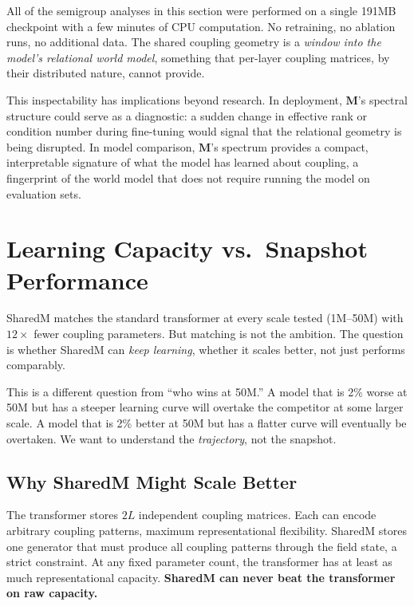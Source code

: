 \documentclass[11pt, a4paper]{article}
\newcommand{\M}{\mathbf{M}}
\theoremstyle{remark}
\begin{document}
All of the semigroup analyses in this section were performed on a single 191MB checkpoint with a few minutes of CPU computation.
No retraining, no ablation runs, no additional data.
The shared coupling geometry is a \emph{window into the model's relational world model}, something that per-layer coupling matrices, by their distributed nature, cannot provide.

This inspectability has implications beyond research.
In deployment, $\M$'s spectral structure could serve as a diagnostic: a sudden change in effective rank or condition number during fine-tuning would signal that the relational geometry is being disrupted.
In model comparison, $\M$'s spectrum provides a compact, interpretable signature of what the model has learned about coupling, a fingerprint of the world model that does not require running the model on evaluation sets.

\section{Learning Capacity vs.\ Snapshot Performance}\label{sec:learning-capacity}

SharedM matches the standard transformer at every scale tested (1M--50M) with $12\times$ fewer coupling parameters.
But matching is not the ambition.
The question is whether SharedM can \emph{keep learning}, whether it scales better, not just performs comparably.

This is a different question from ``who wins at 50M.''
A model that is 2\% worse at 50M but has a steeper learning curve will overtake the competitor at some larger scale.
A model that is 2\% better at 50M but has a flatter curve will eventually be overtaken.
We want to understand the \emph{trajectory}, not the snapshot.

\subsection{Why SharedM Might Scale Better}

The transformer stores $2L$ independent coupling matrices.
Each can encode arbitrary coupling patterns, maximum representational flexibility.
SharedM stores one generator that must produce all coupling patterns through the field state, a strict constraint.
At any fixed parameter count, the transformer has at least as much representational capacity.
\textbf{SharedM can never beat the transformer on raw capacity.}
\end{document}
